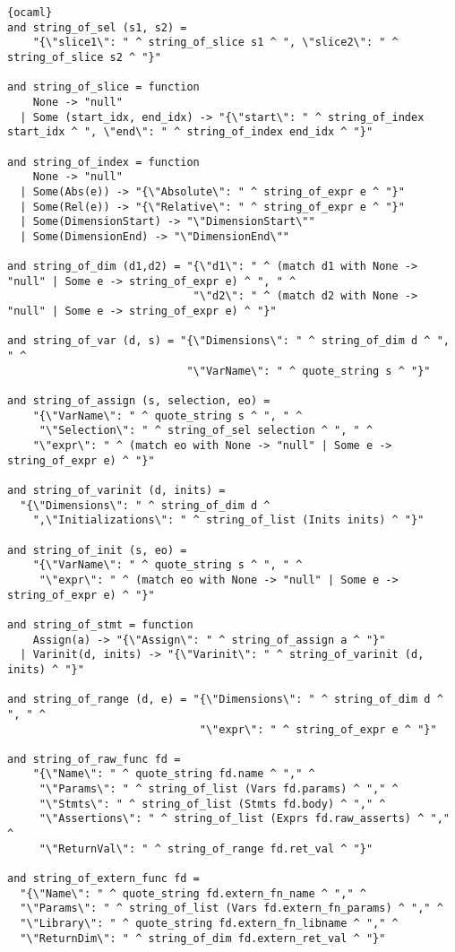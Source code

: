 \begin{lstlisting}{ocaml}
and string_of_sel (s1, s2) =
    "{\"slice1\": " ^ string_of_slice s1 ^ ", \"slice2\": " ^ string_of_slice s2 ^ "}"

and string_of_slice = function
    None -> "null"
  | Some (start_idx, end_idx) -> "{\"start\": " ^ string_of_index start_idx ^ ", \"end\": " ^ string_of_index end_idx ^ "}"

and string_of_index = function
    None -> "null"
  | Some(Abs(e)) -> "{\"Absolute\": " ^ string_of_expr e ^ "}"
  | Some(Rel(e)) -> "{\"Relative\": " ^ string_of_expr e ^ "}"
  | Some(DimensionStart) -> "\"DimensionStart\""
  | Some(DimensionEnd) -> "\"DimensionEnd\""

and string_of_dim (d1,d2) = "{\"d1\": " ^ (match d1 with None -> "null" | Some e -> string_of_expr e) ^ ", " ^
                             "\"d2\": " ^ (match d2 with None -> "null" | Some e -> string_of_expr e) ^ "}"

and string_of_var (d, s) = "{\"Dimensions\": " ^ string_of_dim d ^ ", " ^
                            "\"VarName\": " ^ quote_string s ^ "}"

and string_of_assign (s, selection, eo) =
    "{\"VarName\": " ^ quote_string s ^ ", " ^
     "\"Selection\": " ^ string_of_sel selection ^ ", " ^
    "\"expr\": " ^ (match eo with None -> "null" | Some e -> string_of_expr e) ^ "}"

and string_of_varinit (d, inits) =
  "{\"Dimensions\": " ^ string_of_dim d ^
    ",\"Initializations\": " ^ string_of_list (Inits inits) ^ "}"

and string_of_init (s, eo) =
    "{\"VarName\": " ^ quote_string s ^ ", " ^
     "\"expr\": " ^ (match eo with None -> "null" | Some e -> string_of_expr e) ^ "}"

and string_of_stmt = function
    Assign(a) -> "{\"Assign\": " ^ string_of_assign a ^ "}"
  | Varinit(d, inits) -> "{\"Varinit\": " ^ string_of_varinit (d, inits) ^ "}"

and string_of_range (d, e) = "{\"Dimensions\": " ^ string_of_dim d ^ ", " ^
                              "\"expr\": " ^ string_of_expr e ^ "}"

and string_of_raw_func fd =
    "{\"Name\": " ^ quote_string fd.name ^ "," ^
     "\"Params\": " ^ string_of_list (Vars fd.params) ^ "," ^
     "\"Stmts\": " ^ string_of_list (Stmts fd.body) ^ "," ^
     "\"Assertions\": " ^ string_of_list (Exprs fd.raw_asserts) ^ "," ^
     "\"ReturnVal\": " ^ string_of_range fd.ret_val ^ "}"

and string_of_extern_func fd =
  "{\"Name\": " ^ quote_string fd.extern_fn_name ^ "," ^
  "\"Params\": " ^ string_of_list (Vars fd.extern_fn_params) ^ "," ^
  "\"Library\": " ^ quote_string fd.extern_fn_libname ^ "," ^
  "\"ReturnDim\": " ^ string_of_dim fd.extern_ret_val ^ "}"


\end{lstlisting}
